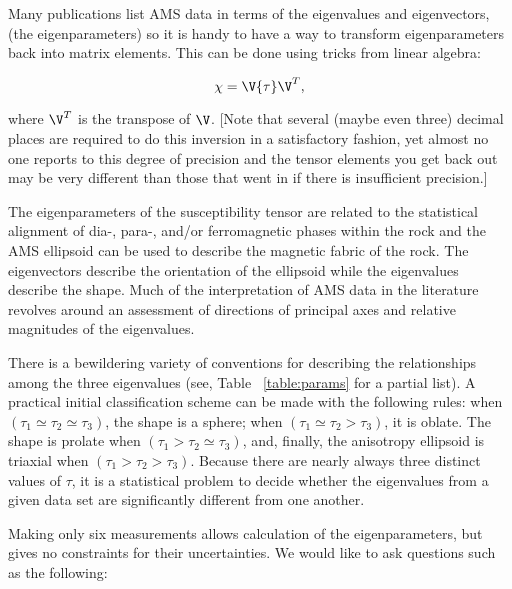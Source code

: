 Many publications list AMS data in terms of the eigenvalues and eigenvectors,
(the eigenparameters)  so it is handy to have a way to transform eigenparameters back into matrix elements.  This can be 
done using tricks from linear algebra:

\begin{equation}
{{\bf \chi}= \V {\bf  \tau} \V}^T,
\label{eq:eigsdj} 
\end{equation}

\noindent where $\V^T$ is the transpose of $\V$.   [Note that several (maybe even three) decimal places are required to do this inversion  in a satisfactory fashion, yet almost no one reports to this degree of precision and the tensor elements you get back out may be very different than those that went in if there is insufficient precision.] 


The eigenparameters of the
susceptibility tensor are related to the statistical alignment of dia-,
para-, and/or ferromagnetic
phases within the rock and the AMS ellipsoid 
can be used to describe the magnetic fabric of the rock. The eigenvectors describe the 
orientation of the ellipsoid while the eigenvalues describe the shape. 
 Much of the interpretation of 
AMS data  in the literature revolves around an assessment of
 directions of principal axes and relative magnitudes of the eigenvalues.  

There is a bewildering variety of conventions for describing the
relationships among the three eigenvalues (see,  Table
~\ref{table:params} for a partial list).  A practical initial classification
scheme can be made with the following 
rules: when $(\tau_1 \simeq \tau_2 \simeq \tau_3)$, the shape is a sphere; when $(\tau_1
 \simeq \tau_2 >
\tau_3)$, it is oblate.  The shape is prolate when $(\tau_1 > 
\tau_2 \simeq \tau_3)$, and, finally, the anisotropy ellipsoid is triaxial
when  $(\tau_1 > \tau_2 > \tau_3)$.  Because there are nearly always
three distinct values of $\tau$,  
it is a statistical problem to decide whether
the eigenvalues from a given data set are significantly different 
from one another.

Making only six measurements allows calculation of the
eigenparameters, but gives no constraints for their uncertainties.  
We would like to ask questions such as the following:

